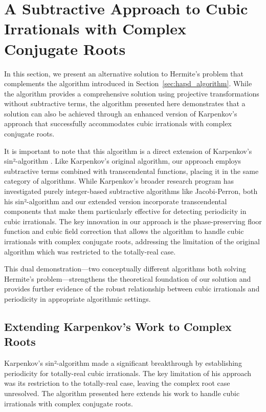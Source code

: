 \section{A Subtractive Approach to Cubic Irrationals with Complex Conjugate Roots}\label{sec:subtractive_algorithm}

In this section, we present an alternative solution to Hermite's problem that complements the \HAPD{} algorithm introduced in Section~\ref{sec:hapd_algorithm}. While the \HAPD{} algorithm provides a comprehensive solution using projective transformations without subtractive terms, the algorithm presented here demonstrates that a solution can also be achieved through an enhanced version of Karpenkov's approach that successfully accommodates cubic irrationals with complex conjugate roots.

It is important to note that this algorithm is a direct extension of Karpenkov's sin²-algorithm \cite{Karpenkov2019}. Like Karpenkov's original algorithm, our approach employs subtractive terms combined with transcendental functions, placing it in the same category of algorithms. While Karpenkov's broader research program has investigated purely integer-based subtractive algorithms like Jacobi-Perron, both his sin²-algorithm and our extended version incorporate transcendental components that make them particularly effective for detecting periodicity in cubic irrationals. The key innovation in our approach is the phase-preserving floor function and cubic field correction that allows the algorithm to handle cubic irrationals with complex conjugate roots, addressing the limitation of the original algorithm which was restricted to the totally-real case.

This dual demonstration—two conceptually different algorithms both solving Hermite's problem—strengthens the theoretical foundation of our solution and provides further evidence of the robust relationship between cubic irrationals and periodicity in appropriate algorithmic settings.

\subsection{Extending Karpenkov's Work to Complex Roots}

Karpenkov's sin²-algorithm \cite{Karpenkov2019} made a significant breakthrough by establishing periodicity for totally-real cubic irrationals. The key limitation of his approach was its restriction to the totally-real case, leaving the complex root case unresolved. The algorithm presented here extends his work to handle cubic irrationals with complex conjugate roots.

